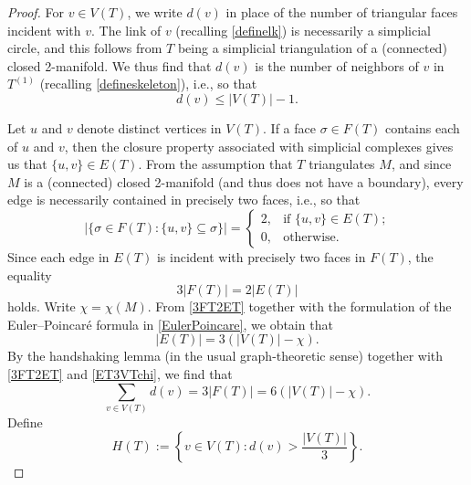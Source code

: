\documentclass[10pt,a4paper]{amsart}
\begin{document}
\begin{proof}
 For $v \in V(T)$, we write $d(v)$ in place of the number of triangular faces incident with $v$. The link of $v$ (recalling \eqref{definelk}) is 
 necessarily a simplicial circle, and this follows from $T$ being a simplicial triangulation of a (connected) 
 closed 2-manifold. We thus find that $d(v)$ is 
 the number of neighbors of $v$ in $T^{(1)}$ (recalling \eqref{defineskeleton}), 
 i.e., so that 
\begin{equation}\label{crudedv} 
 d(v) \leq \left| V(T) \right| - 1. 
\end{equation} 

 Let $u$ and $v$ denote distinct vertices in $V(T)$. 
 If a face $\sigma \in F(T)$ contains each of $u$ and $v$, 
 then the closure property associated with simplicial complexes gives us that 
 $\{ u, v \} \in E(T)$. From the assumption that $T$ triangulates $M$, and since $M$ is a (connected) closed 2-manifold (and thus does 
 not have a boundary), 
 every edge is necessarily contained in precisely two faces, i.e., so that
 \begin{equation*}
 \left| \{ \sigma \in F(T) : \{ u, v \} \subseteq \sigma \} \right| = \begin{cases} 
 2, & \text{if $\{ u, v \} \in E(T)$;} \\ 
 0, & \text{otherwise. } 
 \end{cases} 
\end{equation*}
 Since each edge in $E(T)$ is incident with precisely two faces in $F(T)$, 
 the equality 
\begin{equation}\label{3FT2ET} 
 3 |F(T)| = 2 |E(T)| 
\end{equation}
 holds. Write $\chi = \chi(M)$. From \eqref{3FT2ET} together with the 
 formulation of the Euler--Poincar\'{e} formula in \eqref{EulerPoincare}, 
 we obtain that 
\begin{equation}\label{ET3VTchi} 
 \left| E(T) \right| = 3 \left( \left| V(T) \right| - \chi \right). 
\end{equation}
 By the handshaking lemma (in the usual graph-theoretic sense) 
 together with \eqref{3FT2ET} and \eqref{ET3VTchi}, we find that 
\begin{equation}\label{fromhandshake} 
 \sum_{v \in V(T)} d(v) = 3 \left| F(T) \right| = 6 \left( \left| V(T) \right| - \chi \right). 
\end{equation}
 Define 
\begin{equation}\label{defineHT} 
 H(T) := \left\{ v \in V(T) : d(v) > \frac{ \left| V(T) \right| }{3} \right\}. 

\end{equation}
\end{proof}
\end{document}
